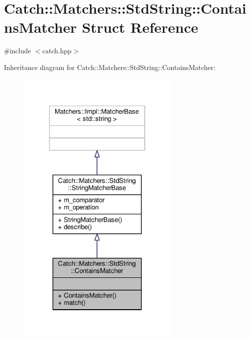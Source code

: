 \hypertarget{struct_catch_1_1_matchers_1_1_std_string_1_1_contains_matcher}{\section{Catch\-:\-:Matchers\-:\-:Std\-String\-:\-:Contains\-Matcher Struct Reference}
\label{struct_catch_1_1_matchers_1_1_std_string_1_1_contains_matcher}
}


{\ttfamily \#include $<$catch.\-hpp$>$}



Inheritance diagram for Catch\-:\-:Matchers\-:\-:Std\-String\-:\-:Contains\-Matcher\-:
\nopagebreak
\begin{figure}[H]
\begin{center}
\leavevmode
\includegraphics[width=226pt]{struct_catch_1_1_matchers_1_1_std_string_1_1_contains_matcher__inherit__graph}
\end{center}
\end{figure}


